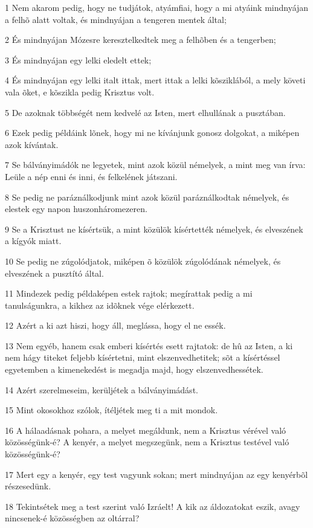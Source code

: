 \par 1 Nem akarom pedig, hogy ne tudjátok, atyámfiai, hogy a mi atyáink mindnyájan a felhõ alatt voltak, és mindnyájan  a tengeren mentek által;
\par 2 És mindnyájan Mózesre keresztelkedtek meg a felhõben és a tengerben;
\par 3 És mindnyájan egy lelki eledelt ettek;
\par 4 És mindnyájan egy lelki italt ittak, mert ittak a lelki kõsziklából, a mely követi vala õket, e kõszikla pedig Krisztus volt.
\par 5 De azoknak többségét nem kedvelé az Isten, mert elhullának a pusztában.
\par 6 Ezek pedig példáink lõnek, hogy mi ne kívánjunk gonosz dolgokat, a miképen azok kívántak.
\par 7 Se bálványimádók ne legyetek, mint azok közül némelyek, a mint meg van írva: Leüle a nép enni és inni, és felkelének  játszani.
\par 8 Se pedig ne paráználkodjunk mint azok közül paráználkodtak némelyek, és elestek egy napon huszonháromezeren.
\par 9 Se a Krisztust ne kísértsük, a mint közülök kísértették némelyek, és elveszének a kígyók miatt.
\par 10 Se pedig ne zúgolódjatok, miképen õ közülök zúgolódának némelyek, és elveszének a pusztító által.
\par 11 Mindezek pedig példaképen estek rajtok; megírattak pedig a mi tanulságunkra, a kikhez az idõknek vége elérkezett.
\par 12 Azért a ki azt hiszi, hogy áll, meglássa, hogy el ne essék.
\par 13 Nem egyéb, hanem csak emberi kísértés esett rajtatok: de hû az Isten, a ki nem hágy titeket feljebb kísértetni, mint elszenvedhetitek; sõt a kísértéssel egyetemben a kimenekedést is megadja majd, hogy elszenvedhessétek.
\par 14 Azért szerelmeseim, kerüljétek a bálványimádást.
\par 15 Mint okosokhoz szólok, ítéljétek meg ti a mit mondok.
\par 16 A hálaadásnak pohara, a melyet megáldunk, nem a Krisztus vérével való közösségünk-é? A kenyér, a melyet megszegünk,  nem a Krisztus testével való közösségünk-é?
\par 17 Mert egy a kenyér, egy test vagyunk sokan; mert mindnyájan az egy kenyérbõl részesedünk.
\par 18 Tekintsétek meg a test szerint való Izráelt! A kik az áldozatokat eszik, avagy nincsenek-é közösségben az oltárral?
